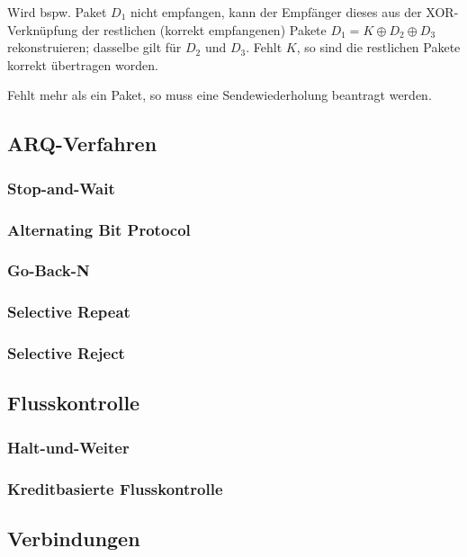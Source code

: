 \documentclass[a4paper, 14pt]{article}
\begin{document}
	Wird bspw. Paket $D_1$ nicht empfangen, kann der Empfänger dieses aus der XOR-Verknüpfung der restlichen (korrekt empfangenen) Pakete $D_1 = K \oplus D_2 \oplus D_3$ rekonstruieren; dasselbe gilt für $D_2$ und $D_3$.
	Fehlt $K$, so sind die restlichen Pakete korrekt übertragen worden.

	Fehlt mehr als ein Paket, so muss eine Sendewiederholung beantragt werden.

	\subsection{ARQ-Verfahren}

	\subsubsection{Stop-and-Wait}

	\subsubsection{Alternating Bit Protocol}

	\subsubsection{Go-Back-N}

	\subsubsection{Selective Repeat}

	\subsubsection{Selective Reject}

	\subsection{Flusskontrolle}

	\subsubsection{Halt-und-Weiter}

	\subsubsection{Kreditbasierte Flusskontrolle}

	\subsection{Verbindungen}
\end{document}
